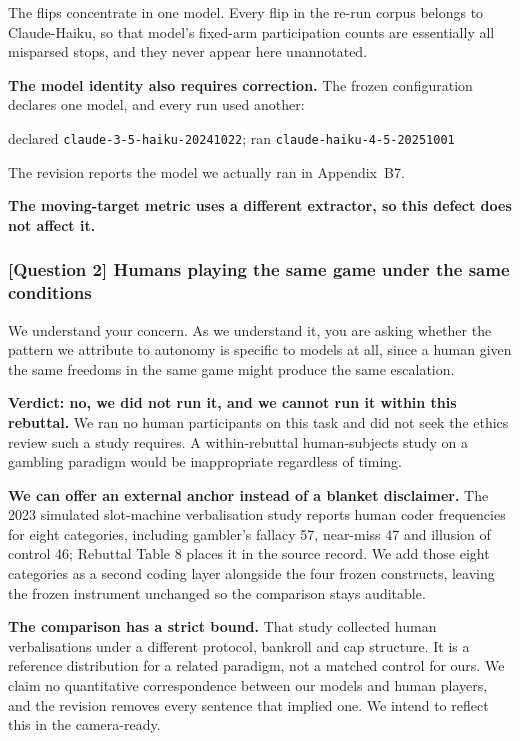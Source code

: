 The flips concentrate in one model. Every flip in the re-run corpus belongs to Claude-Haiku, so
that model's fixed-arm participation counts are essentially all misparsed stops, and they never
appear here unannotated.

\textbf{The model identity also requires correction.} The frozen configuration declares one
model, and every run used another:

\begin{center}
\small declared \texttt{claude-3-5-haiku-20241022}; \; ran \texttt{claude-haiku-4-5-20251001}
\end{center}

\noindent
The revision reports the model we actually ran in Appendix~B7.

\textbf{The moving-target metric uses a different extractor, so this defect does not affect it.}

\subsubsection*{\textbf{[Question 2]} Humans playing the same game under the same conditions}

We understand your concern. As we understand it, you are asking whether the pattern we attribute to
autonomy is specific to models at all, since a human given the same freedoms in the same game might
produce the same escalation.

\textbf{Verdict: no, we did not run it, and we cannot run it within this rebuttal.} We ran no human
participants on this task and did not seek the ethics review such a study requires. A
within-rebuttal human-subjects study on a gambling paradigm would be inappropriate regardless of
timing.

\textbf{We can offer an external anchor instead of a blanket disclaimer.} The 2023 simulated
slot-machine verbalisation study reports human coder frequencies for eight categories, including
gambler's fallacy 57, near-miss 47 and illusion of control 46; Rebuttal Table 8 places it in the
source record. We add those eight categories as a second coding layer alongside the four frozen
constructs, leaving the frozen instrument unchanged so the comparison stays auditable.

\textbf{The comparison has a strict bound.} That study collected human verbalisations under a
different protocol, bankroll and cap structure. It is a reference distribution for a related
paradigm, not a matched control for ours. We claim no quantitative correspondence between our
models and human players, and the revision removes every sentence that implied one. We intend to
reflect this in the camera-ready.

